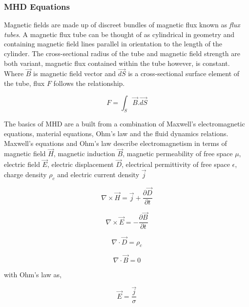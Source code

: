 \subsubsection{MHD Equations}\label{MHDeqns}
Magnetic fields are made up of discreet bundles of magnetic flux known as \emph{flux tubes}. A magnetic flux tube can be thought of as cylindrical in geometry and containing magnetic field lines parallel in orientation to the length of the cylinder. The cross-sectional radius of the tube and magnetic field strength are both variant, magnetic flux contained within the tube however, is constant. Where $\vec{B}$ is magnetic field vector and $\vec{dS}$ is a cross-sectional surface element of the tube, flux $F$ follows the relationship.

\begin{equation}\label{fluxtube}       
F = \int_{S} \vec{B}.\vec{dS}
\end{equation}


The basics of MHD are a built from a combination of Maxwell's electromagnetic equations, material equations, Ohm's law and the fluid dynamics relations. Maxwell's equations and Ohm's law describe electromagnetism in terms of magnetic field $\vec{H}$, magnetic induction $\vec{B}$, magnetic permeability of free space $\mu$, electric field $\vec{E}$, electric displacement $\vec{D}$, electrical permittivity of free space $\epsilon$, charge density $\rho_{c}$ and electric current density $\vec{j}$ 


\begin{equation}\label{max1:ampere}
\nabla\times\vec{H}=\vec{j}+\frac{\partial \vec{D}}{\partial t}
\end{equation}


\begin{equation}\label{max2:faraday}
\nabla\times\vec{E}=-\frac{\partial \vec{B}}{\partial t}
\end{equation}


\begin{equation}\label{max3:gauss}
\nabla\cdot\vec{D}=\rho_{c}
\end{equation}


\begin{equation}\label{max4:nomonopole}
\nabla\cdot\vec{B}=0
\end{equation}

with Ohm's law as,

\begin{equation}\label{ohmslaw}
\vec{E}=\frac{\vec{j}}{\sigma}
\end{equation}

